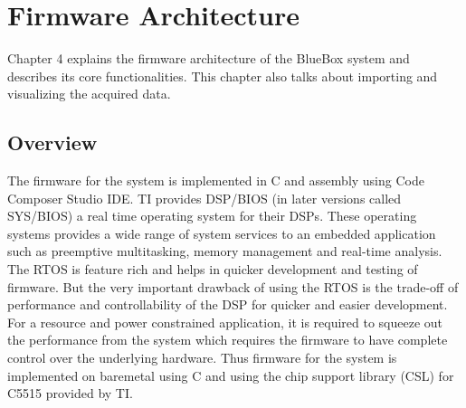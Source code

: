 \chapter{Firmware Architecture}\label{firmware_arch}

Chapter 4 explains the firmware architecture of the BlueBox system and describes its core functionalities. This chapter also talks about importing and visualizing the acquired data.

\section{Overview}
The firmware for the system is implemented in C and assembly using Code Composer Studio IDE. TI provides DSP/BIOS (in later versions called SYS/BIOS) a real time operating system for their DSPs. These operating systems provides a wide range of system services to an embedded application such as preemptive multitasking, memory management and real-time analysis. The RTOS is feature rich and helps in quicker development and testing of firmware. But the very important drawback of using the RTOS is the trade-off of performance and controllability of the DSP for quicker and easier development. For a resource and power constrained application, it is required to squeeze out the performance from the system which requires the firmware to have complete control over the underlying hardware. Thus firmware for the system is implemented on baremetal using C and using the chip support library (CSL) for C5515 provided by TI. 


\vfill

